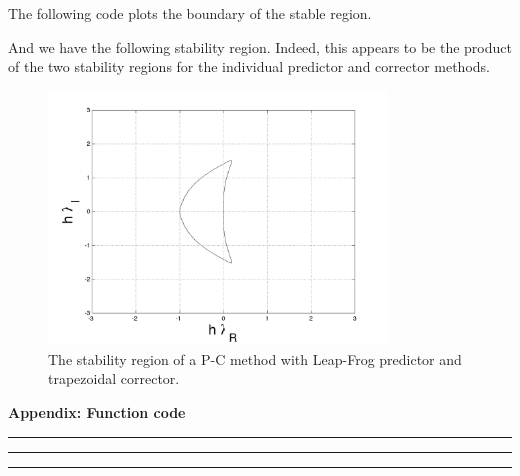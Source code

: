 \documentclass[11pt]{article}
\begin{document}
\begin{enumerate}
The following code plots the boundary of the stable region.


And we have the following stability region.
Indeed, this appears to be the product of the two stability regions for the individual predictor and corrector methods.

\begin{figure}[h!]
  \centering
    \includegraphics[width=0.8\textwidth]{andy_hw04_prb08_02.png}
  \caption{The stability region of a P-C method with Leap-Frog predictor and trapezoidal corrector.}
\end{figure}

\end{enumerate}

\newpage
{\huge \textbf{Appendix: Function code}}


\noindent\rule{4cm}{0.4pt}


\noindent\rule{4cm}{0.4pt}


\noindent\rule{4cm}{0.4pt}


\end{document}
